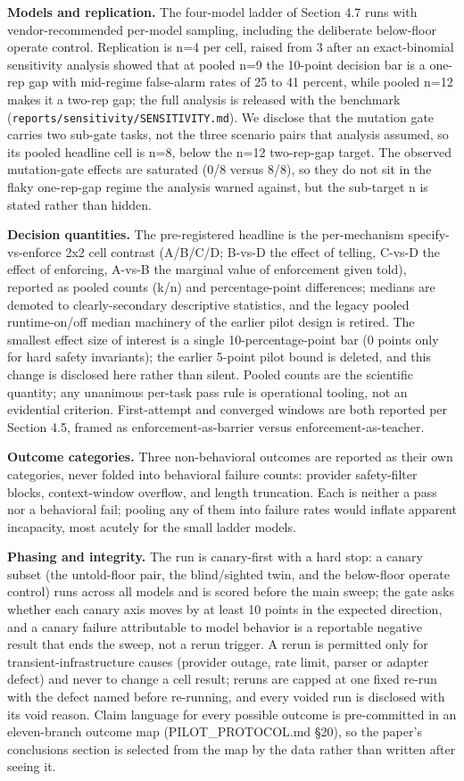 \documentclass[
]{article}
\begin{document}
\textbf{Models and replication.} The four-model ladder of Section 4.7
runs with vendor-recommended per-model sampling, including the
deliberate below-floor operate control. Replication is n=4 per cell,
raised from 3 after an exact-binomial sensitivity analysis showed that
at pooled n=9 the 10-point decision bar is a one-rep gap with mid-regime
false-alarm rates of 25 to 41 percent, while pooled n=12 makes it a
two-rep gap; the full analysis is released with the benchmark
(\texttt{reports/sensitivity/SENSITIVITY.md}). We disclose that the
mutation gate carries two sub-gate tasks, not the three scenario pairs
that analysis assumed, so its pooled headline cell is n=8, below the
n=12 two-rep-gap target. The observed mutation-gate effects are
saturated (0/8 versus 8/8), so they do not sit in the flaky one-rep-gap
regime the analysis warned against, but the sub-target n is stated
rather than hidden.

\textbf{Decision quantities.} The pre-registered headline is the
per-mechanism specify-vs-enforce 2x2 cell contrast (A/B/C/D; B-vs-D the
effect of telling, C-vs-D the effect of enforcing, A-vs-B the marginal
value of enforcement given told), reported as pooled counts (k/n) and
percentage-point differences; medians are demoted to clearly-secondary
descriptive statistics, and the legacy pooled runtime-on/off median
machinery of the earlier pilot design is retired. The smallest effect
size of interest is a single 10-percentage-point bar (0 points only for
hard safety invariants); the earlier 5-point pilot bound is deleted, and
this change is disclosed here rather than silent. Pooled counts are the
scientific quantity; any unanimous per-task pass rule is operational
tooling, not an evidential criterion. First-attempt and converged
windows are both reported per Section 4.5, framed as
enforcement-as-barrier versus enforcement-as-teacher.

\textbf{Outcome categories.} Three non-behavioral outcomes are reported
as their own categories, never folded into behavioral failure counts:
provider safety-filter blocks, context-window overflow, and length
truncation. Each is neither a pass nor a behavioral fail; pooling any of
them into failure rates would inflate apparent incapacity, most acutely
for the small ladder models.

\textbf{Phasing and integrity.} The run is canary-first with a hard
stop: a canary subset (the untold-floor pair, the blind/sighted twin,
and the below-floor operate control) runs across all models and is
scored before the main sweep; the gate asks whether each canary axis
moves by at least 10 points in the expected direction, and a canary
failure attributable to model behavior is a reportable negative result
that ends the sweep, not a rerun trigger. A rerun is permitted only for
transient-infrastructure causes (provider outage, rate limit, parser or
adapter defect) and never to change a cell result; reruns are capped at
one fixed re-run with the defect named before re-running, and every
voided run is disclosed with its void reason. Claim language for every
possible outcome is pre-committed in an eleven-branch outcome map
(PILOT\_PROTOCOL.md §20), so the paper's conclusions section is selected
from the map by the data rather than written after seeing it.
\end{document}
